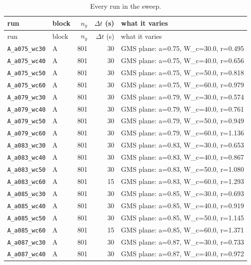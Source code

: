 {\footnotesize
\begin{longtable}{llrrp{7.0cm}}
\caption{Every run in the sweep.}\label{tab:inventory}\\
\toprule
run & block & $n_y$ & $\Delta t$ (s) & what it varies\\
\midrule
\endfirsthead
\toprule
run & block & $n_y$ & $\Delta t$ (s) & what it varies\\
\midrule
\endhead
\bottomrule
\endfoot
\texttt{A\_a075\_wc30} & A & 801 & 30 & GMS plane: a=0.75, W\_c=30.0, r=0.495\\
\texttt{A\_a075\_wc40} & A & 801 & 30 & GMS plane: a=0.75, W\_c=40.0, r=0.656\\
\texttt{A\_a075\_wc50} & A & 801 & 30 & GMS plane: a=0.75, W\_c=50.0, r=0.818\\
\texttt{A\_a075\_wc60} & A & 801 & 30 & GMS plane: a=0.75, W\_c=60.0, r=0.979\\
\texttt{A\_a079\_wc30} & A & 801 & 30 & GMS plane: a=0.79, W\_c=30.0, r=0.574\\
\texttt{A\_a079\_wc40} & A & 801 & 30 & GMS plane: a=0.79, W\_c=40.0, r=0.761\\
\texttt{A\_a079\_wc50} & A & 801 & 30 & GMS plane: a=0.79, W\_c=50.0, r=0.949\\
\texttt{A\_a079\_wc60} & A & 801 & 30 & GMS plane: a=0.79, W\_c=60.0, r=1.136\\
\texttt{A\_a083\_wc30} & A & 801 & 30 & GMS plane: a=0.83, W\_c=30.0, r=0.653\\
\texttt{A\_a083\_wc40} & A & 801 & 30 & GMS plane: a=0.83, W\_c=40.0, r=0.867\\
\texttt{A\_a083\_wc50} & A & 801 & 30 & GMS plane: a=0.83, W\_c=50.0, r=1.080\\
\texttt{A\_a083\_wc60} & A & 801 & 15 & GMS plane: a=0.83, W\_c=60.0, r=1.293\\
\texttt{A\_a085\_wc30} & A & 801 & 30 & GMS plane: a=0.85, W\_c=30.0, r=0.693\\
\texttt{A\_a085\_wc40} & A & 801 & 30 & GMS plane: a=0.85, W\_c=40.0, r=0.919\\
\texttt{A\_a085\_wc50} & A & 801 & 30 & GMS plane: a=0.85, W\_c=50.0, r=1.145\\
\texttt{A\_a085\_wc60} & A & 801 & 15 & GMS plane: a=0.85, W\_c=60.0, r=1.371\\
\texttt{A\_a087\_wc30} & A & 801 & 30 & GMS plane: a=0.87, W\_c=30.0, r=0.733\\
\texttt{A\_a087\_wc40} & A & 801 & 30 & GMS plane: a=0.87, W\_c=40.0, r=0.972\\

\end{longtable}}
